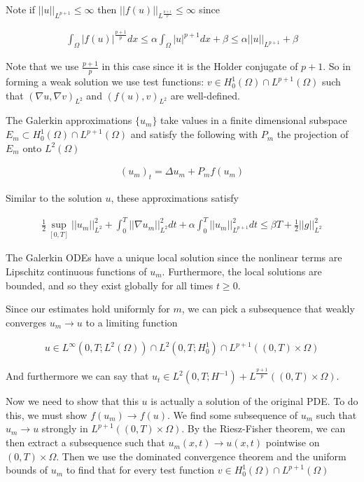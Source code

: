 \documentclass[12pt, letterpaper]{article}
\begin{document}
\begin{enumerate}
\begin{enumerate}
Note if $||u||_{L^{p+1}}\le\infty$ then $||f(u)||_{L^{\frac{p+1}{p}}}\le\infty$ since

\begin{align}
\int_\Omega |f(u)|^{\frac{p+1}{p}}dx\le \alpha\int_\Omega|u|^{p+1}dx+\beta\le\alpha||u||_{L^{p+1}}+\beta
\end{align}

Note that we use $\frac{p+1}{p}$ in this case since it is the Holder conjugate of $p+1$. So in forming a weak solution we use test functions: $v\in H_0^1(\Omega)\cap L^{p+1}(\Omega)$ such that $(\nabla u, \nabla v)_{L^2}$ and $(f(u),v)_{L^2}$ are well-defined.

The Galerkin approximations $\{u_m\}$ take values in a finite dimensional subspace $E_m\subset H_0^1(\Omega)\cap L^{p+1}(\Omega)$ and satisfy the following with $P_m$ the projection of $E_m$ onto $L^2(\Omega)$

\begin{align}
(u_m)_t=\Delta u_m + P_m f(u_m)
\end{align}

Similar to the solution $u$, these approximations satisfy

\begin{align}
\frac{1}{2}\sup_{[0,T]}||u_m||^2_{L^2} + \int_0^T||\nabla u_m||^2_{L^2}dt +\alpha\int_0^T||u_m||_{L^{p+1}}^2dt \le\beta T+\frac{1}{2}||g||^2_{L^2}
\end{align}

The Galerkin ODEs have a unique local solution since the nonlinear terms are Lipschitz continuous functions of $u_m$. Furthermore, the local solutions are bounded, and so they exist globally for all times $t\ge0$.

Since our estimates hold uniformly for $m$, we can pick a subsequence that weakly converges $u_m\rightarrow u$ to a limiting function

\begin{align}
u\in L^\infty(0,T;L^2(\Omega))\cap L^2(0,T;H^1_0)\cap L^{p+1}((0,T)\times\Omega)
\end{align}

And furthermore we can say that $u_t\in L^2(0,T;H^{-1})+ L^\frac{p+1}{p}((0,T)\times\Omega)$.

Now we need to show that this $u$ is actually a solution of the original PDE. To do this, we must show $f(u_m)\rightarrow f(u)$. We find some subsequence of $u_m$ such that $u_m\rightarrow u$ strongly in $L^{p+1}((0,T)\times\Omega)$. By the Riesz-Fisher theorem, we can then extract a subsequence such that $u_m(x,t)\rightarrow u(x,t)$ pointwise on $(0,T)\times\Omega$. Then we use the dominated convergence theorem and the uniform bounds of $u_m$ to find that for every test function $v\in H_0^1(\Omega)\cap L^{p+1}(\Omega)$


\end{enumerate}
\end{enumerate}
\end{document}
